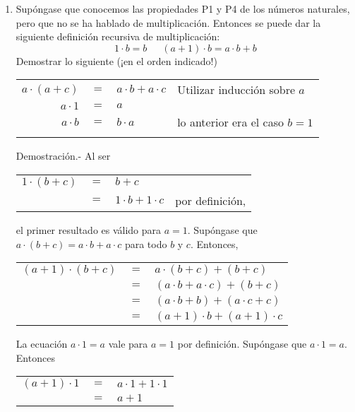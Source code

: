 \begin{enumerate}[\bfseries 1.]
       \item Supóngase que conocemos las propiedades P1 y P4 de los números naturales, pero que no se ha hablado de multiplicación. Entonces se puede dar la siguiente definición recursiva de multiplicación: $$1\cdot b=b\,\,\,\,\,\,\,\,\, (a+1)\cdot b =a\cdot b +b$$
          Demostrar lo siguiente (¡en el orden indicado!)
          \begin{center}
             \begin{tabular}{rcll}
                $a\cdot (a+c)$&$=$&$a\cdot b + a\cdot c$&Utilizar inducción sobre $a$\\
                $a \cdot 1$&$=$&$a$&\\
                $a \cdot b$&$=$&$b\cdot a$&lo anterior era el caso $b=1$\\\\
             \end{tabular}
          \end{center}
          Demostración.-\; Al ser 
	  \begin{center}
	      \begin{tabular}{rcll}
		  $1\cdot (b+c)$&$=$&$b+c$&\\
		  &$=$&$1\cdot b + 1 \cdot c$&por definición,\\
	      \end{tabular}
	  \end{center}
	  el primer resultado es válido para $a=1$. Supóngase que $a\cdot(b+c)=a\cdot b + a\cdot c$ para todo $b$ y $c$. Entonces,
	  \begin{center}
	      \begin{tabular}{rcl}
		  $(a+1)\cdot (b+c)$&$=$&$a\cdot (b+c)+(b+c)$\\
		  &$=$&$(a\cdot b + a\cdot c)+(b+c)$\\
		  &$=$&$(a\cdot b + b) + (a\cdot c + c)$\\
		  &$=$&$(a+1)\cdot b + (a+1)\cdot c$\\
	      \end{tabular}
	  \end{center}
	  La ecuación $a\cdot 1 = a$ vale para $a=1$ por definición. Supóngase que $a\cdot 1 = a$. Entonces
	  \begin{center}
	      \begin{tabular}{rcl}
		  $(a+1)\cdot 1$&$=$&$a\cdot 1 + 1 \cdot 1$\\
		  &$=$&$a+1$\\

\end{tabular}
\end{center}
\end{enumerate}
